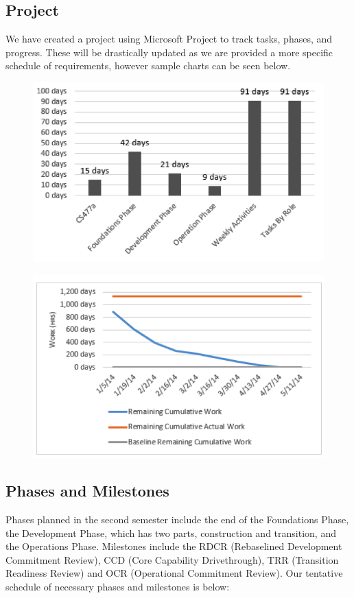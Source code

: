 \subsection{Project}
We have created a project using Microsoft Project to track tasks, phases, and progress. These will be drastically updated as we are provided a more specific schedule of requirements, however sample charts can be seen below.
\begin{figure}[!htbp]
\centering
\includegraphics[scale=0.7]{images/completeness.png}
\end{figure}
\begin{figure}[!htbp]
\centering
\includegraphics[scale=0.7]{images/graph.png}
\end{figure}

\clearpage

\subsection{Phases and Milestones}
Phases planned in the second semester include the end of the Foundations Phase, the Development Phase, which has two parts, construction and transition, and the Operations Phase. 
Milestones include the RDCR (Rebaselined Development Commitment Review), CCD (Core Capability Drivethrough), TRR (Transition Readiness Review) and OCR (Operational Commitment Review). 
Our tentative schedule of necessary phases and milestones is below:

